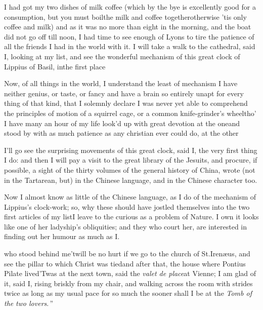 \documentclass{article}
\begin{document}
\newpage
I had got my two dishes of milk coffee (which by the bye is
excellently good for a consumption, but you must boil\break the milk
and coffee together\tsk otherwise ’tis only coffee and milk)\tsk
and as it was no more than eight in the morning, and the boat
did not go off till noon, I had time to see enough of Lyons to
tire the patience of all the friends I had in the world with it.
I will take a walk to the cathedral, said I, looking at my list,
and see the wonderful mechanism of this great clock of Lippius
of Basil, in\break the first place\tsh

Now, of all things in the world, I
understand the least of mechanism\tsh\break
I have neither genius, or taste, or fancy\break
\tsk and have a brain so entirely unapt for\pb
every
thing of that kind, that I solemnly declare I was never yet able to comprehend the
principles of motion of a squirrel cage, or a common knife-grinder’s wheel\tsk tho’ I
have many an hour of my life look’d up with great devotion at the one\tsk and stood by
with as much patience as any christian ever could do, at the other\tsh

I’ll go see the surprising movements of this great clock, said I, the very first
thing I do: and then I will pay a visit to the great library of the Jesuits, and
procure, if possible, a sight of the thirty volumes of the general history of China,
wrote (not in the Tartarean, but) in the Chinese language, and in the Chinese
character too.

\newpage
Now I almost know as little of the\break
Chinese language, as I do of the mechanism of
Lippius’s clock-work; so,\break
why these should have jostled themselves into the two
first articles of my list\tsh I leave to the curious as a problem of Nature.  I own
it looks like one of her ladyship’s obliquities; and they who court her, are
interested in finding out her humour as much as I.

\noindent
{}\break
{}
who stood behind me\tsh ’twill be no hurt if we go to the church of
St.\@ Irenæus, and see the pillar to which Christ was tied\tsh and after that, the
house where Pontius Pilate lived\tsh ’Twas at\pb
the next town, said the \textit{valet de place}\tsk at Vienne; I
am glad of it, said I, rising briskly from my chair, and walking
across the room with strides twice as long as my usual pace\tsh
\lqq for so much\break
\lqq the sooner shall I be at the \textit{Tomb of the}\break
\lqq \textit{two lovers}.\,”
\end{document}
